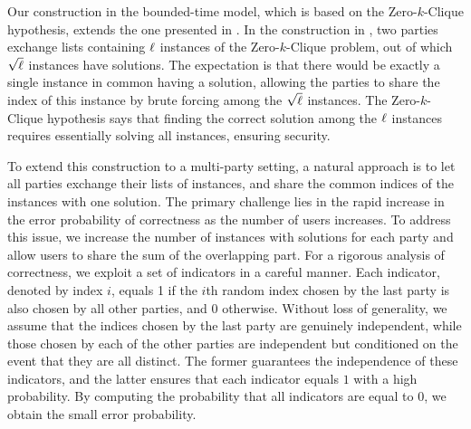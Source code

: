 Our construction in the bounded-time model, which is based on the Zero-$k$-Clique hypothesis, extends the one presented in \cite{C:LaVLinWil19}. In the construction in \cite{C:LaVLinWil19}, two parties exchange lists containing $\ell$ instances of the Zero-$k$-Clique problem, out of which $\sqrt{\ell}$ instances have solutions. The expectation is that there would be exactly a single instance in common having a solution, allowing the parties to share the index of this instance by brute forcing among the $\sqrt{\ell}$ instances.
The Zero-$k$-Clique hypothesis says that finding the correct solution among the $\ell$ instances requires essentially solving all instances, ensuring security.

To extend this construction to a multi-party setting, a natural approach is to let all parties exchange their lists of instances, and share the common indices of the instances with one solution. The primary challenge lies in the rapid increase in the error probability of correctness as the number of users increases. To address this issue, we increase the number of instances with solutions for each party and allow users to share the sum of the overlapping part. For a rigorous analysis of correctness, we exploit a set of indicators in a careful manner. Each indicator, denoted by index $i$, equals 1 if the $i$th random index chosen by the last party is also chosen by all other parties, and $0$ otherwise. Without loss of generality, we assume that the indices chosen by the last party are genuinely independent, while those chosen by each of the other parties are independent but conditioned on the event that they are all distinct. The former guarantees the independence of these indicators, and the latter ensures that each indicator equals $1$ with a high probability. By computing the probability that all indicators are equal to 0, we obtain the small error probability.

